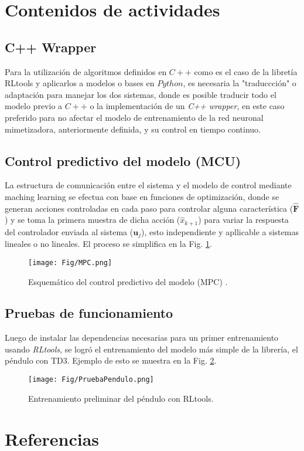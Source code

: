 \documentclass[12pt]{article}
\begin{document}
\section*{Contenidos de actividades}

\subsection*{C++ Wrapper}

Para la utilización de algoritmos definidos en $C++$ como es el caso de la libretía RLtools y aplicarlos a modelos o bases en $Python$, es necesaria la "traduccción" o adaptación para manejar los dos sistemas, donde es posible traducir todo el modelo previo a $C++$ o la implementación de un \textit{C++ wrapper}, en este caso preferido para no afectar el modelo de entrenamiento de la red neuronal mimetizadora, anteriormente definida, y su control en tiempo continuo.

\subsection*{Control predictivo del modelo (MCU)}

La estructura de comunicación entre el sistema y el modelo de control mediante maching learning se efectua con base en funciones de optimización, donde se generan acciones controladas en cada paso para controlar alguna característica ($\mathbf{\hat{F}}$) y se toma la primera muestra de dicha acción ($\hat{x}_{k+1}$) para variar la respuesta del controlador enviada al sistema ($\mathbf{u}_j$), esto independiente y apllicable a sistemas lineales o no lineales. El proceso se simplifica en la Fig. \ref{fig:mpc}.


\begin{figure}[h]
	\centering
	\texttt{[image: Fig/MPC.png]}
	\caption{Esquemático del control predictivo del modelo (MPC) \cite{DataScience}.}
	\label{fig:mpc}
\end{figure}


\subsection*{Pruebas de funcionamiento}

Luego de instalar las dependencias necesarias para un primer entrenamiento usando \textit{RLtools}, se logró el entrenamiento del modelo más simple de la librería, el péndulo con TD3. Ejemplo de esto se muestra en la Fig. \ref{fig:pendtraining}.


\begin{figure}[h]
	\centering
	\texttt{[image: Fig/PruebaPendulo.png]}
	\caption{Entrenamiento preliminar del péndulo con RLtools.}
	\label{fig:pendtraining}
\end{figure}






\newpage

\section*{Referencias}
\renewcommand\refname{}


\end{document}
